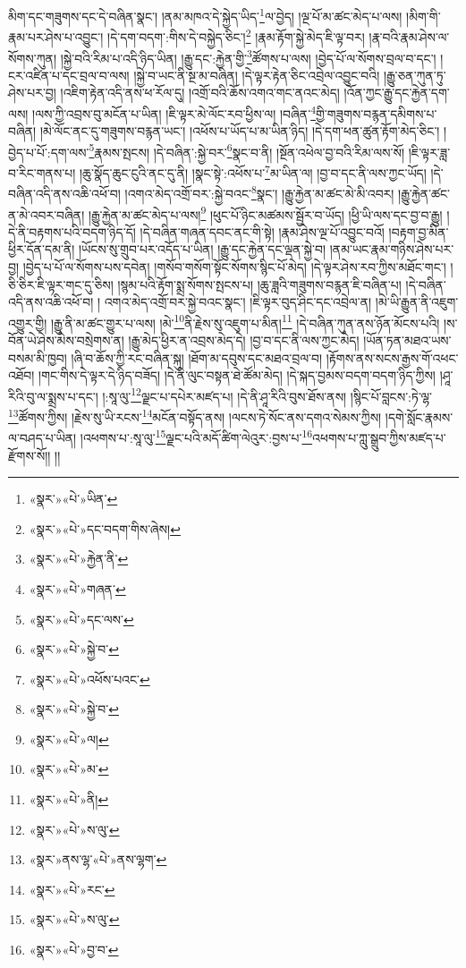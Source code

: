 མིག་དང་གཟུགས་དང་དེ་བཞིན་སྣང་། །ནམ་མཁའ་དེ་སྐྱེད་ཡིད་\footnote{«སྣར་»«པེ་»ཡིན་}ལ་བྱེད། །ལྔ་པོ་མ་ཚང་མེད་པ་ལས། །མིག་གི་རྣམ་པར་ཤེས་པ་འབྱུང་། །དེ་དག་བདག་:གིས་དེ་བསྐྱེད་ཅིང་།\footnote{«སྣར་»«པེ་»དང་བདག་གིས་ཞེས།} །རྣམ་རྟོག་སྐྱེ་མེད་ཇི་ལྟ་བར། །རྣ་བའི་རྣམ་ཤེས་ལ་སོགས་ཀུན། །སྐྱེ་བའི་རིམ་པ་འདི་ཉིད་ཡིན། །རྒྱུ་དང་:རྐྱེན་གྱི་\footnote{«སྣར་»«པེ་»རྐྱེན་ནི་}ཚོགས་པ་ལས། །བྱེད་པོ་ལ་སོགས་བྲལ་བ་དང་། །ངར་འཛིན་པ་དང་བྲལ་བ་ལས། །སྐྱེ་བ་ཡང་ནི་སྔ་མ་བཞིན། །དེ་ལྟར་རྟེན་ཅིང་འབྲེལ་འབྱུང་བའི། །རྒྱུ་ཅན་ཀུན་ཏུ་ཤེས་པར་བྱ། །འཇིག་རྟེན་འདི་ནས་ཕ་རོལ་དུ། །འགྲོ་བའི་ཆོས་འགའ་གང་ནའང་མེད། །འོན་ཀྱང་རྒྱུ་དང་རྐྱེན་དག་ལས། །ལས་ཀྱི་འབྲས་བུ་མངོན་པ་ཡིན། །ཇི་ལྟར་མེ་ལོང་རབ་ཕྱིས་ལ། །བཞིན་\footnote{«སྣར་»«པེ་»གཞན་}གྱི་གཟུགས་བརྙན་དམིགས་པ་བཞིན། །མེ་ལོང་ནང་དུ་གཟུགས་བརྙན་ཡང་། །འཕོས་པ་ཡོད་པ་མ་ཡིན་ཉིད། །དེ་དག་ཕན་ཚུན་རྟོག་མེད་ཅིང་། །བྱེད་པ་པོ་:དག་ལས་\footnote{«སྣར་»«པེ་»དང་ལས་}རྣམས་སྤངས། །དེ་བཞིན་:སྐྱེ་བར་\footnote{«སྣར་»«པེ་»སྐྱེ་བ་}སྣང་བ་ནི། །སྔོན་འཕེལ་བྱ་བའི་རིམ་ལས་སོ། །ཇི་ལྟར་ཟླ་བ་རིང་གནས་པ། །ཆུ་སྣོད་ཆུང་ངུའི་ནང་དུ་ནི། །སྣང་སྟེ་:འཕོས་པ་\footnote{«སྣར་»«པེ་»འཕོས་པའང་}མ་ཡིན་ལ། །བྱ་བ་དང་ནི་ལས་ཀྱང་ཡོད། །དེ་བཞིན་འདི་ནས་འཆི་འཕོ་བ། །འགའ་མེད་འགྲོ་བར་:སྐྱེ་བའང་\footnote{«སྣར་»«པེ་»སྐྱེ་བ་}སྣང་། །རྒྱུ་རྐྱེན་མ་ཚང་མེ་མི་འབར། །རྒྱུ་རྐྱེན་ཚང་ན་མེ་འབར་བཞིན། །རྒྱུ་རྐྱེན་མ་ཚང་མེད་པ་ལས།\footnote{«སྣར་»«པེ་»ལ།} །ཕུང་པོ་ཉིང་མཚམས་སྦྱོར་བ་ཡོད། །ཕྱི་ཡི་ལས་དང་བྱ་བ་རྒྱུ། །དེ་ནི་བརྟགས་པའི་བདག་ཉིད་དོ། །དེ་བཞིན་གཞན་དབང་ནང་གི་སྟེ། །རྣམ་ཤེས་ལྔ་པོ་འབྱུང་བའོ། །བརྟག་བྱ་མིན་ཕྱིར་དོན་དམ་ནི། །ཡོངས་སུ་གྲུབ་པར་འདོད་པ་ཡིན། །རྒྱུ་དང་རྐྱེན་དང་ལྡན་སྐྱེ་བ། །ནམ་ཡང་རྣམ་གཉིས་ཤེས་པར་བྱ། །བྱེད་པ་པོ་ལ་སོགས་པས་དབེན། །གསོབ་གསོག་སྟོང་སོགས་སྙིང་པོ་མེད། །དེ་ལྟར་ཤེས་རབ་ཀྱིས་མཐོང་གང་། །ཅི་ཅིར་ཇི་ལྟར་གང་དུ་ཅིས། །སྙམ་པའི་རྟོག་སྨྲ་སོགས་སྤངས་པ། །ཆུ་ཟླའི་གཟུགས་བརྙན་ཇི་བཞིན་པ། །དེ་བཞིན་འདི་ནས་འཆི་འཕོ་བ། །
འགའ་མེད་འགྲོ་བར་སྐྱེ་བའང་སྣང་། །ཇི་ལྟར་བུད་ཤིང་དང་འབྲེལ་ན། །མེ་ཡི་རྒྱུན་ནི་འཇུག་འགྱུར་གྱི། །རྒྱུ་ནི་མ་ཚང་གྱུར་པ་ལས། །མེ་\footnote{«སྣར་»«པེ་»མ་}ནི་རྗེས་སུ་འཇུག་པ་མིན།\footnote{«སྣར་»«པེ་»ནི།} །དེ་བཞིན་ཀུན་ནས་ཉོན་མོངས་པའི། །ས་བོན་ཡེ་ཤེས་མེས་བསྲེགས་ན། །རྒྱུ་མེད་ཕྱིར་ན་འབྲས་མེད་དེ། །བྱ་བ་དང་ནི་ལས་ཀྱང་མེད། །ཡོན་ཏན་མཐའ་ཡས་བསམ་མི་ཁྱབ། །ཞི་བ་ཆོས་ཀྱི་རང་བཞིན་སྐུ། །ཐོག་མ་དབུས་དང་མཐའ་བྲལ་བ། །རྟོགས་ནས་སངས་རྒྱས་གོ་འཕང་འཐོབ། །གང་གིས་དེ་ལྟར་དེ་ཉིད་བཟོད། །དེ་ནི་ལུང་བསྟན་ཐེ་ཚོམ་མེད། །དེ་སྐད་བྱམས་བདག་བདག་ཉིད་ཀྱིས། །ཤཱ་རིའི་བུ་ལ་སྨྲས་པ་དང་། །:སཱ་ལུ་\footnote{«སྣར་»«པེ་»ས་ལུ་}ལྗང་པ་དཔེར་མཛད་པ། །དེ་ནི་ཤཱ་རིའི་བུས་ཐོས་ནས། །སྙིང་པོ་བླངས་:ཏེ་ལྷ་\footnote{«སྣར་»ནས་ལྷ་«པེ་»ནས་ལྷག་}ཚོགས་ཀྱིས། །རྗེས་སུ་ཡི་རངས་\footnote{«སྣར་»«པེ་»རང་}མངོན་བསྟོད་ནས། །ལངས་ཏེ་སོང་ནས་དགའ་སེམས་ཀྱིས། །དགེ་སློང་རྣམས་ལ་བཤད་པ་ཡིན། །འཕགས་པ་:སཱ་ལུ་\footnote{«སྣར་»«པེ་»ས་ལུ་}ལྗང་པའི་མདོ་ཚིག་ལེའུར་:བྱས་པ་\footnote{«སྣར་»«པེ་»བྱ་བ་}འཕགས་པ་ཀླུ་སྒྲུབ་ཀྱིས་མཛད་པ་རྫོགས་སོ།། །།